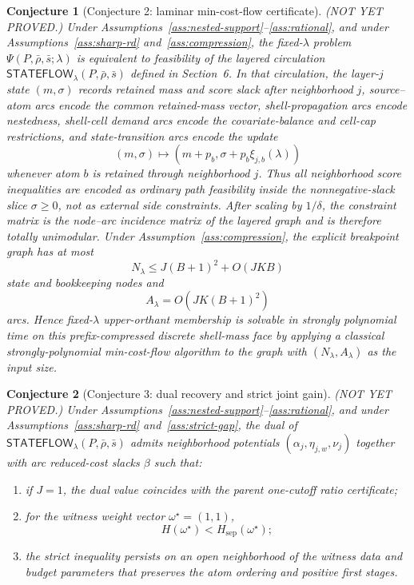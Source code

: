 \documentclass[11pt]{article}
\theoremstyle{definition}
\theoremstyle{plain}
\newtheorem{conjecture}{Conjecture}
\theoremstyle{remark}
\begin{document}
\begin{conjecture}[Conjecture 2: laminar min-cost-flow certificate]\label{conj:flow}
(NOT YET PROVED.) Under Assumptions~\ref{ass:nested-support}--\ref{ass:rational}, and under
Assumptions~\ref{ass:sharp-rd} and~\ref{ass:compression}, the fixed-\(\lambda\) problem
\(\Psi(P,\bar\rho,\bar s;\lambda)\) is equivalent to feasibility of the layered circulation
\(\mathsf{STATEFLOW}_\lambda(P,\bar\rho,\bar s)\) defined in Section~6. In that circulation,
the layer-\(j\) state \((m,\sigma)\) records retained mass and score slack after neighborhood
\(j\), source--atom arcs encode the common retained-mass vector, shell-propagation arcs encode
nestedness, shell-cell demand arcs encode the covariate-balance and cell-cap restrictions, and
state-transition arcs encode the update
\[
  (m,\sigma)\mapsto (m+p_b,\sigma+p_b\xi_{j,b}(\lambda))
\]
whenever atom \(b\) is retained through neighborhood \(j\). Thus all neighborhood score
inequalities are encoded as ordinary path feasibility inside the nonnegative-slack slice
\(\sigma\ge 0\), not as external side constraints. After scaling by \(1/\delta\), the
constraint matrix is the node--arc incidence matrix of the layered graph and is therefore
totally unimodular. Under Assumption~\ref{ass:compression}, the explicit breakpoint graph has at
most
\[
  N_\lambda \le J(B+1)^2 + O(JKB)
\]
state and bookkeeping nodes and
\[
  A_\lambda = O(JK(B+1)^2)
\]
arcs. Hence fixed-\(\lambda\) upper-orthant membership is solvable in strongly polynomial time on
this prefix-compressed discrete shell-mass face by applying a classical strongly-polynomial
min-cost-flow algorithm to the graph with \((N_\lambda,A_\lambda)\) as the input size.
\end{conjecture}

\begin{conjecture}[Conjecture 3: dual recovery and strict joint gain]\label{conj:dual-gap}
(NOT YET PROVED.) Under Assumptions~\ref{ass:nested-support}--\ref{ass:rational}, and under
Assumptions~\ref{ass:sharp-rd} and~\ref{ass:strict-gap}, the dual of
\(\mathsf{STATEFLOW}_\lambda(P,\bar\rho,\bar s)\) admits neighborhood potentials
\((\alpha_j,\eta_{j,w},\nu_j)\) together with arc reduced-cost slacks \(\beta\) such that:
\begin{enumerate}[leftmargin=*]
  \item if \(J=1\), the dual value coincides with the parent one-cutoff ratio certificate;
  \item for the witness weight vector \(\omega^\star=(1,1)\),
  \[
    H(\omega^\star)<H_{\mathrm{sep}}(\omega^\star);
  \]
  \item the strict inequality persists on an open neighborhood of the witness data and budget
  parameters that preserves the atom ordering and positive first stages.
\end{enumerate}
\end{conjecture}
\end{document}
